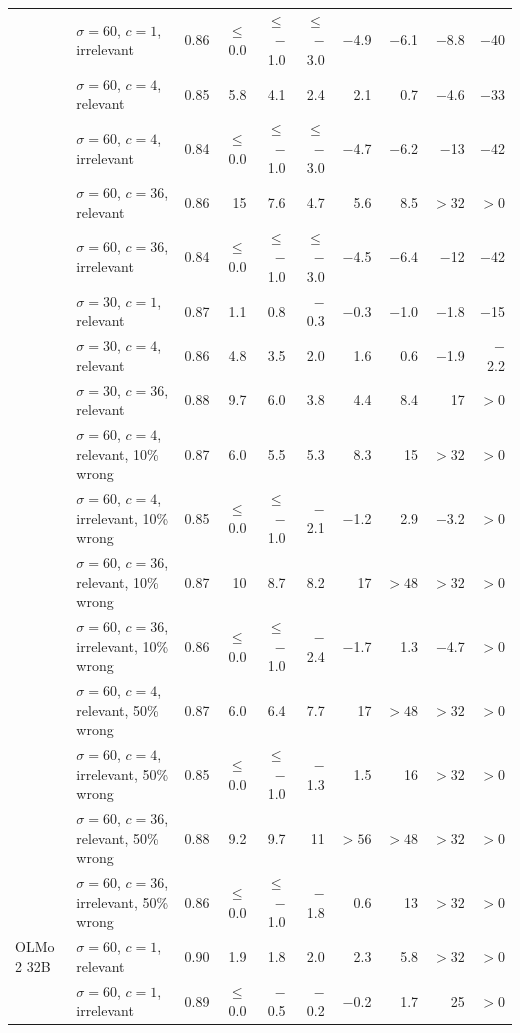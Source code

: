 \begin{tabular}{llrrrrrrrr}
 & $\sigma = 60$, $c = 1$, irrelevant & 0.86 & $\leq$ 0.0 & $\leq$ $-$1.0 & $\leq$ $-$3.0 & $-$4.9 & $-$6.1 & $-$8.8 & $-$40 \\
 & $\sigma = 60$, $c = 4$, relevant & 0.85 & 5.8 & 4.1 & 2.4 & 2.1 & 0.7 & $-$4.6 & $-$33 \\
 & $\sigma = 60$, $c = 4$, irrelevant & 0.84 & $\leq$ 0.0 & $\leq$ $-$1.0 & $\leq$ $-$3.0 & $-$4.7 & $-$6.2 & $-$13 & $-$42 \\
 & $\sigma = 60$, $c = 36$, relevant & 0.86 & 15 & 7.6 & 4.7 & 5.6 & 8.5 & $> 32$ & $> 0$ \\
 & $\sigma = 60$, $c = 36$, irrelevant & 0.84 & $\leq$ 0.0 & $\leq$ $-$1.0 & $\leq$ $-$3.0 & $-$4.5 & $-$6.4 & $-$12 & $-$42 \\
 & $\sigma = 30$, $c = 1$, relevant & 0.87 & 1.1 & 0.8 & $-$0.3 & $-$0.3 & $-$1.0 & $-$1.8 & $-$15 \\
 & $\sigma = 30$, $c = 4$, relevant & 0.86 & 4.8 & 3.5 & 2.0 & 1.6 & 0.6 & $-$1.9 & $-$2.2 \\
 & $\sigma = 30$, $c = 36$, relevant & 0.88 & 9.7 & 6.0 & 3.8 & 4.4 & 8.4 & 17 & $> 0$ \\
 & $\sigma = 60$, $c = 4$, relevant, 10\% wrong & 0.87 & 6.0 & 5.5 & 5.3 & 8.3 & 15 & $> 32$ & $> 0$ \\
 & $\sigma = 60$, $c = 4$, irrelevant, 10\% wrong & 0.85 & $\leq$ 0.0 & $\leq$ $-$1.0 & $-$2.1 & $-$1.2 & 2.9 & $-$3.2 & $> 0$ \\
 & $\sigma = 60$, $c = 36$, relevant, 10\% wrong & 0.87 & 10 & 8.7 & 8.2 & 17 & $> 48$ & $> 32$ & $> 0$ \\
 & $\sigma = 60$, $c = 36$, irrelevant, 10\% wrong & 0.86 & $\leq$ 0.0 & $\leq$ $-$1.0 & $-$2.4 & $-$1.7 & 1.3 & $-$4.7 & $> 0$ \\
 & $\sigma = 60$, $c = 4$, relevant, 50\% wrong & 0.87 & 6.0 & 6.4 & 7.7 & 17 & $> 48$ & $> 32$ & $> 0$ \\
 & $\sigma = 60$, $c = 4$, irrelevant, 50\% wrong & 0.85 & $\leq$ 0.0 & $\leq$ $-$1.0 & $-$1.3 & 1.5 & 16 & $> 32$ & $> 0$ \\
 & $\sigma = 60$, $c = 36$, relevant, 50\% wrong & 0.88 & 9.2 & 9.7 & 11 & $> 56$ & $> 48$ & $> 32$ & $> 0$ \\
 & $\sigma = 60$, $c = 36$, irrelevant, 50\% wrong & 0.86 & $\leq$ 0.0 & $\leq$ $-$1.0 & $-$1.8 & 0.6 & 13 & $> 32$ & $> 0$ \\
\midrule
OLMo 2 32B & $\sigma = 60$, $c = 1$, relevant & 0.90 & 1.9 & 1.8 & 2.0 & 2.3 & 5.8 & $> 32$ & $> 0$ \\
 & $\sigma = 60$, $c = 1$, irrelevant & 0.89 & $\leq$ 0.0 & $-$0.5 & $-$0.2 & $-$0.2 & 1.7 & 25 & $> 0$ \\

\end{tabular}
